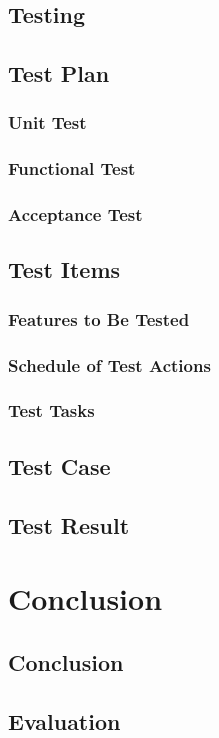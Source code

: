 \documentclass[12pt, oneside, a4paper]{book}
\begin{document}
		\section{Testing}
		\section{Test Plan}
			\subsection{Unit Test}
			\subsection{Functional Test}
			\subsection{Acceptance Test}
		\section{Test Items}
			\subsection{Features to Be Tested}
			\subsection{Schedule of Test Actions}
			\subsection{Test Tasks}
		\section{Test Case}
		\section{Test Result}
		\newpage	
	\chapter{Conclusion}
		\section{Conclusion}
		\section{Evaluation}
\end{document}

